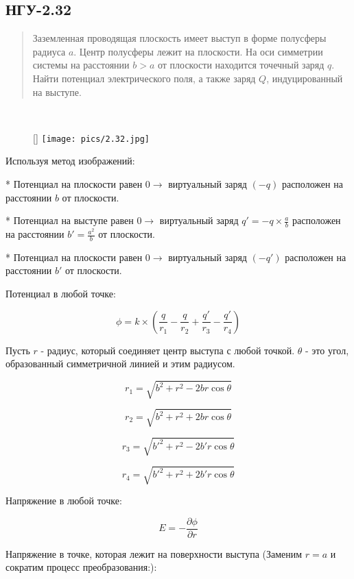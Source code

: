\subsection*{НГУ-2.32}

\setcounter{equation}{0}

\begin{abstract}
Заземленная проводящая плоскость имеет выступ в форме полусферы радиуса $a$. Центр полусферы лежит на плоскости. На оси симметрии системы на расстоянии $b > a$ от плоскости находится точечный заряд $q$. Найти потенциал электрического поля, а также заряд $Q$, индуцированный на выступе.
\end{abstract}

\noindent \hrulefill
\\
\begin{wrapfigure}[6]{r}{0.30\textwidth}
	\raisebox{0pt}[\dimexpr{}\baselineskip\relax]{
	\texttt{[image: pics/2.32.jpg]}}
\end{wrapfigure}

Используя метод изображений: 

* Потенциал на плоскости равен $0 \rightarrow$ виртуальный заряд $(-q)$ расположен на расстоянии $b$ от плоскости.

* Потенциал на выступе равен $0 \rightarrow$ виртуальный заряд $q'=-q \times \frac{a}{b}$ расположен на расстоянии $b'=\frac{a^2}{b}$ от плоскости.

* Потенциал на плоскости равен $0 \rightarrow$ виртуальный заряд $(-q')$ расположен на расстоянии $b'$ от плоскости.

Потенциал в любой точке:

$$\phi = k \times (\frac{q}{r_1} - \frac{q}{r_2} + \frac{q'}{r_3} - \frac{q'}{r_4})$$

 Пусть $r$ - радиус, который соединяет центр выступа с любой точкой. $\theta$ - это угол, образованный симметричной линией и этим радиусом.

$$r_1 = \sqrt{b^2 + r^2 -2br \cos{\theta}}$$

$$r_2 = \sqrt{b^2 + r^2 +2br \cos{\theta}}$$

$$r_3 = \sqrt{b'^2 + r^2 -2b'r \cos{\theta}}$$

$$r_4 = \sqrt{b'^2 + r^2 +2b'r \cos{\theta}}$$

Напряжение в любой точке:

$$E = -\frac{\partial\phi}{\partial r}$$

Напряжение в точке, которая лежит на поверхности выступа (Заменим $r = a$ и сократим процесс преобразования:):

